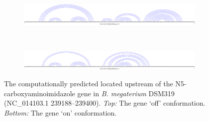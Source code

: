 \begin{figure}[!ht]
\centering
\begin{subfigure}[h]{\textwidth}
\centering
\includegraphics[width=.9\textwidth]{Figures/Ribofinder/NC_014103_1_239188_239400_OFF.pdf}
\end{subfigure} \\
\medskip
\begin{subfigure}[h]{\textwidth}
\centering
\includegraphics[width=.9\textwidth]{Figures/Ribofinder/NC_014103_1_239188_239400_ON.pdf}
\end{subfigure}
\caption[Structures for the putative \rb located upstream of the N5- carboxy\-amino\-imidazole gene in {\em B. megaterium} DSM319]{The computationally predicted \rb located upstream of the
N5- carboxy\-amino\-imidazole
gene in {\em B. megaterium} DSM319 (NC\_014103.1 239188--239400).
{\em Top:} The gene `off' conformation. {\em Bottom:} The gene `on' conformation.}
\label{fig:figure:NC_014103_1_239188_239400}
\end{figure}
